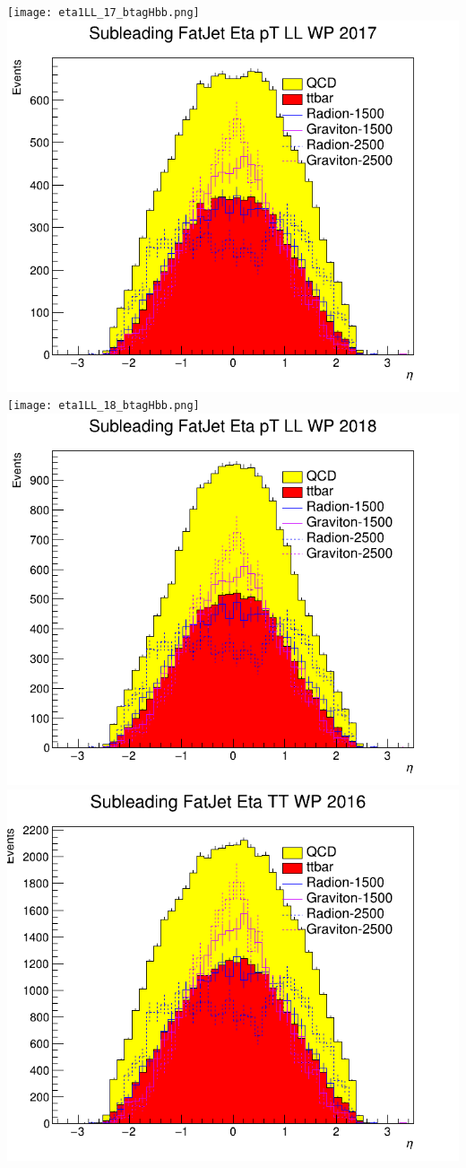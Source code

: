 \texttt{[image: eta1LL\_17\_btagHbb.png]}
\includegraphics[width=1\textwidth]{eta1LL_17_deepTagMD_HbbvsQCD.png}
\texttt{[image: eta1LL\_18\_btagHbb.png]}
\includegraphics[width=1\textwidth]{eta1LL_18_deepTagMD_HbbvsQCD.png}
\includegraphics[width=1\textwidth]{eta1TT_16_btagHbb.png}
